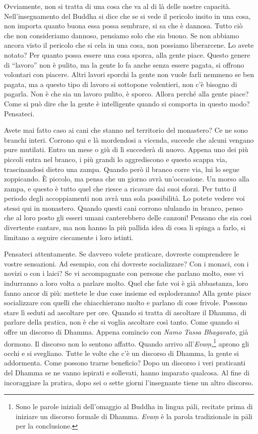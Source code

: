 Ovviamente, non si tratta di una cosa che va al di là delle nostre
capacità. Nell'insegnamento del Buddha si dice che se si vede il
pericolo insito in una cosa, non importa quanto buona essa possa
sembrare, si sa che è dannosa. Tutto ciò che non consideriamo dannoso,
pensiamo solo che sia buono. Se non abbiamo ancora visto il pericolo che
si cela in una cosa, non possiamo liberarcene. Lo avete notato? Per
quanto possa essere una cosa sporca, alla gente piace. Questo genere di
``lavoro'' non è pulito, ma la gente lo fa anche senza essere pagata, si
offrono volontari con piacere. Altri lavori sporchi la gente non vuole
farli nemmeno se ben pagata, ma a questo tipo di lavoro si sottopone
volentieri, non c'è bisogno di pagarla. Non è che sia un lavoro pulito,
è sporco. Allora perché alla gente piace? Come si può dire che la gente
è intelligente quando si comporta in questo modo? Pensateci.

Avete mai fatto caso ai cani che stanno nel territorio del monastero? Ce
ne sono branchi interi. Corrono qui e là mordendosi a vicenda, succede
che alcuni vengano pure mutilati. Entro un mese o giù di lì succederà di
nuovo. Appena uno dei più piccoli entra nel branco, i più grandi lo
aggrediscono e questo scappa via, trascinandosi dietro una zampa. Quando
però il branco corre via, lui lo segue zoppicando. È piccolo, ma pensa
che un giorno avrà un'occasione. Un morso alla zampa, e questo è tutto
quel che riesce a ricavare dai suoi sforzi. Per tutto il periodo degli
accoppiamenti non avrà una sola possibilità. Lo potete vedere voi stessi
qui in monastero. Quando questi cani corrono ululando in branco, penso
che al loro posto gli esseri umani canterebbero delle canzoni! Pensano
che sia così divertente cantare, ma non hanno la più pallida idea di
cosa li spinga a farlo, si limitano a seguire ciecamente i loro istinti.

Pensateci attentamente. Se davvero volete praticare, dovreste
comprendere le vostre sensazioni. Ad esempio, con chi dovreste
socializzare? Con i monaci, con i novizi o con i laici? Se vi
accompagnate con persone che parlano molto, esse vi indurranno a loro
volta a parlare molto. Quel che fate voi è già abbastanza, loro fanno
ancor di più: mettete le due cose insieme ed esploderanno! Alla gente
piace socializzare con quelli che chiacchierano molto e parlano di cose
frivole. Possono stare lì seduti ad ascoltare per ore. Quando si tratta
di ascoltare il Dhamma, di parlare della pratica, non è che si voglia
ascoltare così tanto. Come quando si offre un discorso di Dhamma. Appena
comincio con \emph{Namo Tassa Bhagavato}, già dormono. Il discorso non
lo sentono affatto. Quando arrivo all'\emph{Evaṃ},\footnote{Sono le
  parole iniziali dell'omaggio al Buddha in lingua pāli, recitate prima
  di iniziare un discorso formale di Dhamma. \emph{Evaṃ} è la parola
  tradizionale in pāli per la conclusione.} aprono gli occhi e si
svegliano. Tutte le volte che c'è un discorso di Dhamma, la gente si
addormenta. Come possono trarne beneficio? Dopo un discorso i veri
praticanti del Dhamma se ne vanno ispirati e sollevati, hanno imparato
qualcosa. Al fine di incoraggiare la pratica, dopo sei o sette giorni
l'insegnante tiene un altro discorso.

